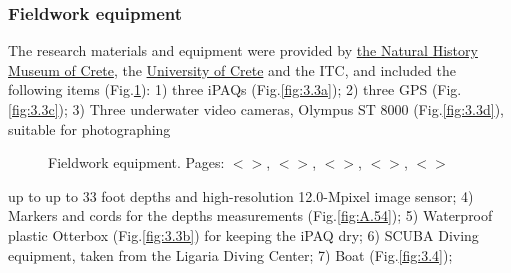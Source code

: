 \documentclass[11pt]{article}
\begin{document}
\subsubsection{Fieldwork equipment}\label{page-24}
The research materials and equipment were provided by \href{http://147.52.130.151/MFIK_en/}{the Natural History Museum of Crete}, the \href{http://www.uoc.gr/Department/index.html}{University of Crete} and the ITC, and included the following items\label{page-24} (Fig.\ref{fig:3.3}): 1) three iPAQs (Fig.\ref{fig:3.3a}); 2)
three GPS (Fig.\ref{fig:3.3c}); 3) Three underwater video cameras, \ac{Olympus ST} 8000  (Fig.\ref{fig:3.3d}), suitable for photographing 

\begin{figure}[H]
	\centering
	\caption{Fieldwork equipment. Pages: $<$\pageref{page-15}$>$, $<$\pageref{page-24}$>$, $<$\pageref{page-25}$>$, $<$\pageref{page-26}$>$, $<$\pageref{page-27}$>$}
	\label{fig:3.3}
\end{figure}

up to up to 33 foot depths and high-resolution 12.0-Mpixel image sensor; 4)
Markers and cords for the depths measurements (Fig.\ref{fig:A.54}); 5) Waterproof plastic Otterbox  (Fig.\ref{fig:3.3b}) for keeping the
iPAQ dry; 6) \ac{SCUBA} Diving equipment, taken from the Ligaria Diving Center; 7) Boat (Fig.\ref{fig:3.4}); 
\end{document}

